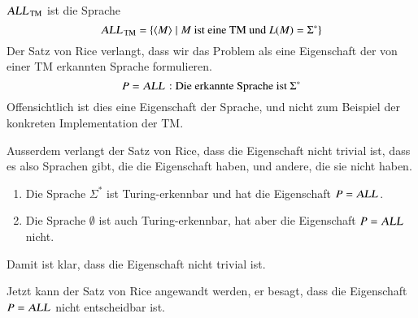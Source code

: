 \begin{beispiel}
$\text{\textsl{ALL}}_{\text{TM}}$ ist die Sprache
\[
\text{\textsl{ALL}}_{\text{TM}}=\{
\langle M\rangle\;|\; \text{$M$ ist eine TM und $L(M)=\Sigma^*$}
\}
\]
Der Satz von Rice verlangt, dass wir das Problem als eine Eigenschaft
der von einer TM erkannten Sprache formulieren.
\[
P=\text{\textsl{ALL}}:\text{Die erkannte Sprache ist $\Sigma^*$}
\]
Offensichtlich ist dies eine Eigenschaft der Sprache, und nicht zum
Beispiel der konkreten Implementation der TM.

Ausserdem verlangt der Satz von Rice, dass die Eigenschaft nicht trivial ist,
dass es also Sprachen gibt, die die Eigenschaft haben, und andere, die
sie nicht haben. 
\begin{enumerate}
\item Die Sprache $\Sigma^*$ ist Turing-erkennbar und hat die Eigenschaft
$P=\text{\textsl{ALL}}$.
\item Die Sprache $\emptyset$ ist auch Turing-erkennbar, hat aber die
Eigenschaft
$P=\text{\textsl{ALL}}$ nicht.
\end{enumerate}
Damit ist klar, dass die Eigenschaft nicht trivial ist.

Jetzt kann der Satz von Rice angewandt werden, er besagt, dass die
Eigenschaft
$P=\text{\textsl{ALL}}$ nicht entscheidbar ist.
\end{beispiel}

